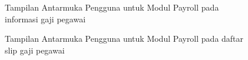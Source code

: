 \begin{figure}[H]
\centering
{}
\caption{Tampilan Antarmuka Pengguna untuk Modul Payroll pada informasi gaji pegawai}
\label{fig:payroll_information}
\end{figure}    

\begin{figure}
\centering
{}
\caption{Tampilan Antarmuka Pengguna untuk Modul Payroll pada daftar slip gaji pegawai}
\label{fig:salary_slip_list}
\end{figure}

